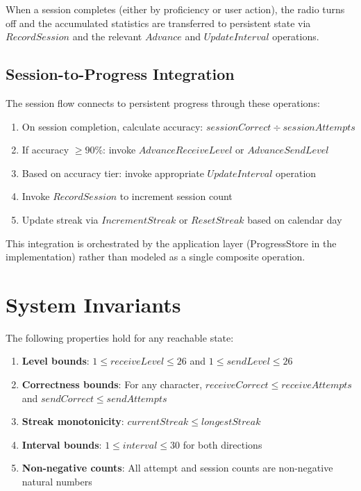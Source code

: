 \documentclass[a4paper,10pt,fleqn]{article}
\begin{document}
When a session completes (either by proficiency or user action), the radio
turns off and the accumulated statistics are transferred to persistent state
via $RecordSession$ and the relevant $Advance$ and $UpdateInterval$ operations.

\subsection{Session-to-Progress Integration}

The session flow connects to persistent progress through these operations:

\begin{enumerate}
\item On session completion, calculate accuracy: $sessionCorrect \div sessionAttempts$
\item If accuracy $\geq 90\%$: invoke $AdvanceReceiveLevel$ or $AdvanceSendLevel$
\item Based on accuracy tier: invoke appropriate $UpdateInterval$ operation
\item Invoke $RecordSession$ to increment session count
\item Update streak via $IncrementStreak$ or $ResetStreak$ based on calendar day
\end{enumerate}

This integration is orchestrated by the application layer (ProgressStore in the
implementation) rather than modeled as a single composite operation.

\section{System Invariants}

The following properties hold for any reachable state:

\begin{enumerate}
\item \textbf{Level bounds}: $1 \leq receiveLevel \leq 26$ and
      $1 \leq sendLevel \leq 26$

\item \textbf{Correctness bounds}: For any character,
      $receiveCorrect \leq receiveAttempts$ and
      $sendCorrect \leq sendAttempts$

\item \textbf{Streak monotonicity}: $currentStreak \leq longestStreak$

\item \textbf{Interval bounds}: $1 \leq interval \leq 30$ for both directions

\item \textbf{Non-negative counts}: All attempt and session counts are
      non-negative natural numbers
\end{enumerate}
\end{document}
